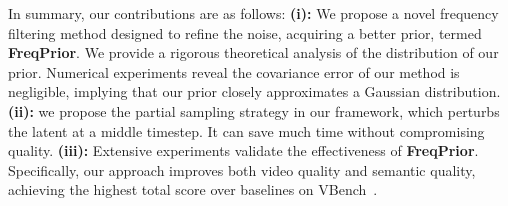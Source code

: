 In summary, our contributions are as follows:
\textbf{(i):}
We propose a novel frequency filtering method designed to refine the noise, acquiring a better prior, termed {\bf FreqPrior}. We provide a rigorous theoretical analysis of the distribution of our prior. Numerical experiments reveal the covariance error of our method is negligible, implying that our prior closely approximates a Gaussian distribution.
\textbf{(ii):} we propose the partial sampling strategy in our framework, which perturbs the latent at a middle timestep. It can save much time without compromising quality.
\textbf{(iii):} Extensive experiments validate the effectiveness of \textbf{FreqPrior}. 
Specifically, our approach improves both video quality and semantic quality, achieving the highest total score over baselines on VBench~\citep{huang2023vbench}.
